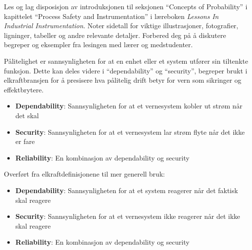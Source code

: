 

Les og lag disposisjon av introduksjonen til seksjonen ``Concepts of Probability'' i kapittelet ``Process Safety and Instrumentation'' i læreboken {\it Lessons In Industrial Instrumentation}. Noter sidetall for viktige illustrasjoner, fotografier, ligninger, tabeller og andre relevante detaljer. Forbered deg på å diskutere begreper og eksempler fra lesingen med lærer og medstudenter.














Pålitelighet er sannsynligheten for at en enhet eller et system utfører sin tiltenkte funksjon. Dette kan deles videre i ``dependability'' og ``security'', begreper brukt i elkraftbransjen for å presisere hva pålitelig drift betyr for vern som sikringer og effektbrytere.

\begin{itemize}
\item{} {\bf Dependability}: Sannsynligheten for at et vernesystem kobler ut strøm når det skal 
\item{} {\bf Security}: Sannsynligheten for at et vernesystem lar strøm flyte når det ikke er fare
\item{} {\bf Reliability}: En kombinasjon av dependability og security 
\end{itemize}

\noindent
Overført fra elkraftdefinisjonene til mer generell bruk:

\begin{itemize}
\item{} {\bf Dependability}: Sannsynligheten for at et system reagerer når det faktisk skal reagere
\item{} {\bf Security}: Sannsynligheten for at et vernesystem ikke reagerer når det ikke skal reagere
\item{} {\bf Reliability}: En kombinasjon av dependability og security 
\end{itemize}







